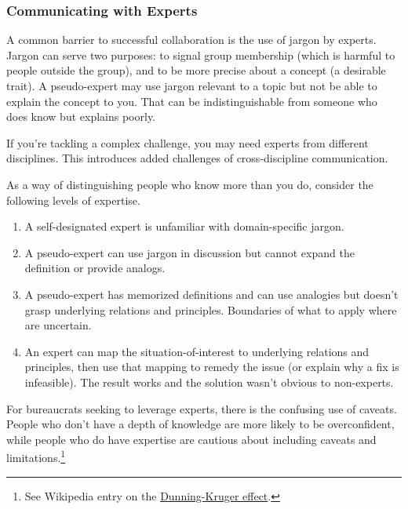 \subsubsection*{Communicating with Experts}
A common barrier to successful collaboration is the use of jargon by experts.
Jargon can serve two purposes: to signal group membership (which is harmful to people outside the group), and to be more precise about a concept (a desirable trait). A pseudo-expert may use jargon relevant to a topic but not be able to explain the concept to you. That can be indistinguishable from someone who does know but explains poorly.

If you're tackling a complex challenge, you may need experts from different disciplines. This introduces added challenges of cross-discipline communication. 

As a way of distinguishing people who know more than you do, consider the following levels of expertise.
\begin{enumerate}
    \item A self-designated expert is unfamiliar with domain-specific jargon.
    \item A pseudo-expert can use jargon in discussion but cannot expand the definition or provide analogs.
    \item A pseudo-expert has memorized definitions and can use analogies but doesn't grasp underlying relations and principles. Boundaries of what to apply where are uncertain.
    \item An expert can map the situation-of-interest to underlying relations and principles, then use that mapping to remedy the issue (or explain why a fix is infeasible). The result works and the solution wasn't obvious to non-experts.
\end{enumerate}

For bureaucrats seeking to leverage experts, there is the confusing use of caveats. People who don't have a depth of knowledge are more likely to be overconfident, while people who do have expertise are cautious about including caveats and limitations.\footnote{See Wikipedia entry on the \href{https://en.wikipedia.org/wiki/Dunning\%E2\%80\%93Kruger_effect}{Dunning-Kruger effect}.
}

